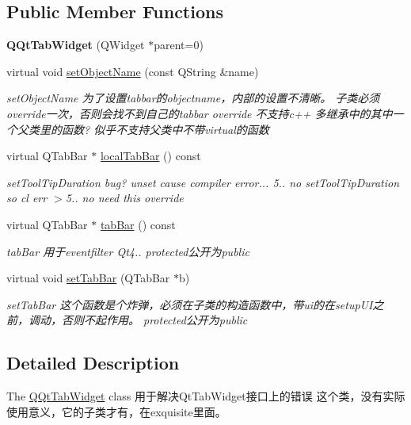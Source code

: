 \subsection*{Public Member Functions}
\begin{DoxyCompactItemize}
\item 
\mbox{\label{class_q_qt_tab_widget_a743d19dd483b7d17ac4be673ae53348c}} 
{\bfseries Q\+Qt\+Tab\+Widget} (Q\+Widget $\ast$parent=0)
\item 
virtual void \mbox{\hyperlink{class_q_qt_tab_widget_a45cec441f1ceb658d628a23c110359f3}{set\+Object\+Name}} (const Q\+String \&name)
\begin{DoxyCompactList}\small\item\em set\+Object\+Name 为了设置tabbar的objectname，内部的设置不清晰。 子类必须override一次，否则会找不到自己的tabbar override 不支持c++ 多继承中的其中一个父类里的函数? 似乎不支持父类中不带virtual的函数 \end{DoxyCompactList}\item 
virtual Q\+Tab\+Bar $\ast$ \mbox{\hyperlink{class_q_qt_tab_widget_a53183c40775ba6e7142f429edfd75d9c}{local\+Tab\+Bar}} () const
\begin{DoxyCompactList}\small\item\em set\+Tool\+Tip\+Duration bug? unset cause compiler error... 5.. no set\+Tool\+Tip\+Duration so cl err $>$5.. no need this override \end{DoxyCompactList}\item 
virtual Q\+Tab\+Bar $\ast$ \mbox{\hyperlink{class_q_qt_tab_widget_a3785188e6017cb3d449aed554bb12c9a}{tab\+Bar}} () const
\begin{DoxyCompactList}\small\item\em tab\+Bar 用于eventfilter Qt4.. protected公开为public \end{DoxyCompactList}\item 
virtual void \mbox{\hyperlink{class_q_qt_tab_widget_a9c9d4cf7245410c77ec464fb865d1d54}{set\+Tab\+Bar}} (Q\+Tab\+Bar $\ast$b)
\begin{DoxyCompactList}\small\item\em set\+Tab\+Bar 这个函数是个炸弹，必须在子类的构造函数中，带ui的在setup\+U\+I之前，调动，否则不起作用。 protected公开为public \end{DoxyCompactList}\end{DoxyCompactItemize}


\subsection{Detailed Description}
The \mbox{\hyperlink{class_q_qt_tab_widget}{Q\+Qt\+Tab\+Widget}} class 用于解决\+Qt\+Tab\+Widget接口上的错误 这个类，没有实际使用意义，它的子类才有，在exquisite里面。 

